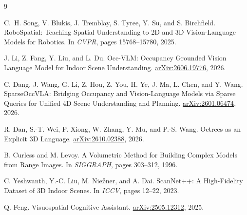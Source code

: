 \documentclass[10pt,twocolumn,letterpaper]{article}
\begin{document}
\begin{thebibliography}{9}

C.~H. Song, V. Blukis, J. Tremblay, S. Tyree, Y. Su,
and S. Birchfield.
\newblock RoboSpatial: Teaching Spatial Understanding to 2D
and 3D Vision-Language Models for Robotics.
\newblock In \emph{CVPR}, pages 15768--15780, 2025.

J. Li, Z. Fang, Y. Liu, and L. Du.
\newblock Occ-VLM: Occupancy Grounded Vision Language Model
for Indoor Scene Understanding.
\newblock \href{https://arxiv.org/abs/2606.19776}
{arXiv:2606.19776}, 2026.

C. Dang, J. Wang, G. Li, Z. Hou, Z. You, H. Ye,
J. Ma, L. Chen, and Y. Wang.
\newblock SparseOccVLA: Bridging Occupancy and Vision-Language
Models via Sparse Queries for Unified 4D Scene Understanding
and Planning.
\newblock \href{https://arxiv.org/abs/2601.06474}
{arXiv:2601.06474}, 2026.

R. Dan, S.-T. Wei, P. Xiong, W. Zhang, Y. Mu,
and P.-S. Wang.
\newblock Octrees as an Explicit 3D Language.
\newblock \href{https://arxiv.org/abs/2610.02388}
{arXiv:2610.02388}, 2026.

B. Curless and M. Levoy.
\newblock A Volumetric Method for Building Complex Models
from Range Images.
\newblock In \emph{SIGGRAPH}, pages 303--312, 1996.

C. Yeshwanth, Y.-C. Liu, M. Nie{\ss}ner, and A. Dai.
\newblock ScanNet++: A High-Fidelity Dataset of 3D Indoor Scenes.
\newblock In \emph{ICCV}, pages 12--22, 2023.

Q. Feng.
\newblock Visuospatial Cognitive Assistant.
\newblock \href{https://arxiv.org/abs/2505.12312}
{arXiv:2505.12312}, 2025.

\end{thebibliography}
\end{document}
